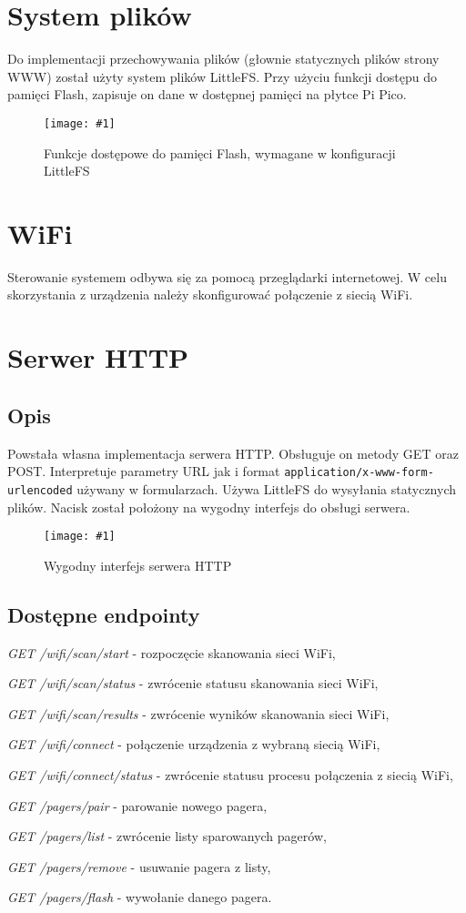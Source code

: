 \documentclass[12pt]{article}
\let\tempone\itemize
\let\temptwo\enditemize
\renewenvironment{itemize}{\tempone\setlength{\itemsep}{0cm}}{\temptwo}
\newcommand{\imgcustomsize}[3]{
	\begin{figure}[H]
		\centering
		\texttt{[image: \#1]}
		\caption{#2}
	\end{figure}
}
\newcommand{\img}[2]{\imgcustomsize{#1}{#2}{0.8}}
\begin{document}
	 \section{System plików}
	 	Do implementacji przechowywania plików (głownie statycznych plików strony WWW) został użyty system plików LittleFS. Przy użyciu funkcji dostępu do pamięci Flash, zapisuje on dane w dostępnej pamięci na płytce Pi Pico.
	 	\img{pgm/littlefs}{Funkcje dostępowe do pamięci Flash, wymagane w konfiguracji LittleFS}

	 \section{WiFi}
        Sterowanie systemem odbywa się za pomocą przeglądarki internetowej. W celu skorzystania z urządzenia należy skonfigurować połączenie z siecią WiFi.


	 \section{Serwer HTTP}
        \subsection{Opis}
            Powstała własna implementacja serwera HTTP. Obsługuje on metody GET oraz POST. Interpretuje parametry URL jak i format \lstinline|application/x-www-form-urlencoded| używany w formularzach. Używa LittleFS do wysyłania statycznych plików. Nacisk został położony na wygodny interfejs do obsługi serwera.
            \img{pgm/http_init}{Wygodny interfejs serwera HTTP}
        \subsection{Dostępne endpointy}
        \begin{itemize}
            \item \emph{GET /wifi/scan/start} - rozpoczęcie skanowania sieci WiFi,
            \item \emph{GET /wifi/scan/status} - zwrócenie statusu skanowania sieci WiFi,
            \item \emph{GET /wifi/scan/results} - zwrócenie wyników skanowania sieci WiFi,
            \item \emph{GET /wifi/connect} - połączenie urządzenia z wybraną siecią WiFi,
            \item \emph{GET /wifi/connect/status} - zwrócenie statusu procesu połączenia z siecią WiFi,
            \item \emph{GET /pagers/pair} - parowanie nowego pagera,
            \item \emph{GET /pagers/list} - zwrócenie listy sparowanych pagerów,
            \item \emph{GET /pagers/remove} - usuwanie pagera z listy,
            \item \emph{GET /pagers/flash} - wywołanie danego pagera.
        \end{itemize}
\end{document}
